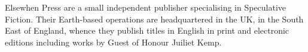 Elsewhen Press are a small independent publisher specialising in
Speculative Fiction. Their Earth-based operations are headquartered in
the UK, in the South East of England, whence they publish titles in
English in print and electronic editions \textemdash{} including works
by Guest of Honour Juiliet Kemp.
